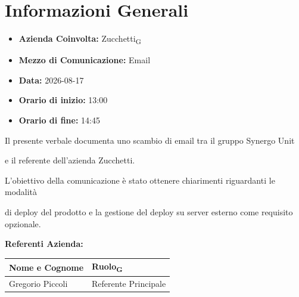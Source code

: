 
\section{Informazioni Generali}

\begin{itemize}

\item \textbf{Azienda Coinvolta:} Zucchetti\textsubscript{G}

\item \textbf{Mezzo di Comunicazione:} Email

\item \textbf{Data:} 2026-08-17

\item \textbf{Orario di inizio:} 13:00

\item \textbf{Orario di fine:} 14:45

\end{itemize}


Il presente verbale documenta uno scambio di email tra il gruppo Synergo Unit

e il referente dell'azienda Zucchetti.

L'obiettivo della comunicazione è stato ottenere chiarimenti riguardanti le modalità 

di deploy del prodotto e la gestione del deploy su server esterno come requisito opzionale.



\vspace{0.5cm}

\textbf{Referenti Azienda:}

\begin{table}[ht]

\centering

\renewcommand{\arraystretch}{1.2}

\begin{tabularx}{\textwidth}{X l}

\toprule

\textbf{Nome e Cognome} & \textbf{Ruolo\textsubscript{G}} \\

\midrule

Gregorio Piccoli & Referente Principale \\

\bottomrule

\end{tabularx}

\end{table}


